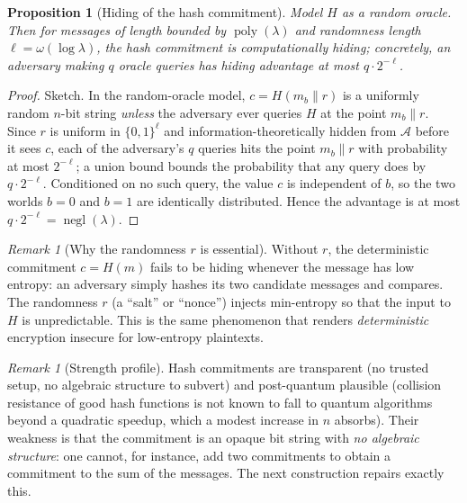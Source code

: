 \documentclass[11pt,a4paper]{article}
\newtheorem{proposition}[theorem]{Proposition}
\theoremstyle{definition}
\theoremstyle{remark}
\newtheorem{remark}[theorem]{Remark}
\DeclareMathOperator{\negl}{negl}
\DeclareMathOperator{\poly}{poly}
\begin{document}
\begin{proposition}[Hiding of the hash commitment]\label{commitments:prop:hash-hiding}
Model \(H\) as a random oracle. Then for messages of length bounded by \(\poly(\lambda)\) and randomness length \(\ell = \omega(\log \lambda)\), the hash commitment is computationally hiding; concretely, an adversary making \(q\) oracle queries has hiding advantage at most \(q \cdot 2^{-\ell}\).
\end{proposition}

\begin{proof}
Sketch. In the random-oracle model, \(c = H(m_b \| r)\) is a uniformly random \(n\)-bit string \emph{unless} the adversary ever queries \(H\) at the point \(m_b \| r\). Since \(r\) is uniform in \(\{0,1\}^\ell\) and information-theoretically hidden from \(\mathcal{A}\) before it sees \(c\), each of the adversary's \(q\) queries hits the point \(m_b \| r\) with probability at most \(2^{-\ell}\); a union bound bounds the probability that any query does by \(q \cdot 2^{-\ell}\). Conditioned on no such query, the value \(c\) is independent of \(b\), so the two worlds \(b=0\) and \(b=1\) are identically distributed. Hence the advantage is at most \(q \cdot 2^{-\ell} = \negl(\lambda)\).
\end{proof}

\begin{remark}[Why the randomness \(r\) is essential]\label{commitments:rem:hash-salt}
Without \(r\), the deterministic commitment \(c = H(m)\) fails to be hiding whenever the message has low entropy: an adversary simply hashes its two candidate messages and compares. The randomness \(r\) (a ``salt'' or ``nonce'') injects min-entropy so that the input to \(H\) is unpredictable. This is the same phenomenon that renders \emph{deterministic} encryption insecure for low-entropy plaintexts.
\end{remark}

\begin{remark}[Strength profile]\label{commitments:rem:hash-profile}
Hash commitments are transparent (no trusted setup, no algebraic structure to subvert) and post-quantum plausible (collision resistance of good hash functions is not known to fall to quantum algorithms beyond a quadratic speedup, which a modest increase in \(n\) absorbs). Their weakness is that the commitment is an opaque bit string with \emph{no algebraic structure}: one cannot, for instance, add two commitments to obtain a commitment to the sum of the messages. The next construction repairs exactly this.
\end{remark}
\end{document}
